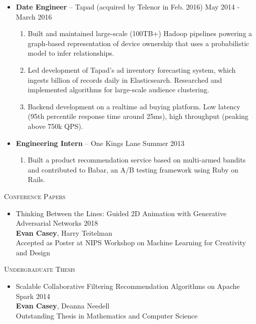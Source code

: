\documentclass[11pt]{article}
\renewcommand{\section}[1]
{\vspace{1.0\baselineskip}{\Large\textbf{#1}}}
\begin{document}
\begin{itemize}[leftmargin=12pt]
\begin{enumerate}[leftmargin=2em,labelindent=16pt,label=$\bullet$]
    \end{enumerate}
  \item[] \textbf{Date Engineer} -- Tapad (acquired by Telenor in Feb. 2016) \hfill May 2014 - March 2016 
    \begin{enumerate}[leftmargin=2em,labelindent=16pt,label=$\bullet$]
      \item Built and maintained large-scale (100TB+) Hadoop pipelines powering a graph-based representation of device ownership that uses a probabilistic model to infer relationships.
      \item Led development of Tapad's ad inventory forecasting system, which ingests billion of records daily in Elasticsearch. Researched and implemented algorithms for large-scale audience clustering.
      \item Backend development on a realtime ad buying platform. Low latency (95th percentile response time around 25ms), high throughput (peaking above 750k QPS).
    \end{enumerate}
  \item[] \textbf{Engineering Intern} -- One Kings Lane \hfill Summer 2013 
    \begin{enumerate}[leftmargin=2em,labelindent=16pt,label=$\bullet$]
      \item Built a product recommendation service based on multi-armed bandits and contributed to Babar, an A/B testing framework using Ruby on Rails.
    \end{enumerate}
\end{itemize}

\section{Publications}

\textsc{Conference Papers}
\begin{itemize}[leftmargin=12pt]
  \item[] Thinking Between the Lines: Guided 2D Animation with Generative Adversarial Networks \hfill 2018 \\
  \textbf{Evan Casey}, Harry Teitelman \\
  Accepted as Poster at NIPS Workshop on Machine Learning for Creativity and Design
\end{itemize}

\textsc{Undergraduate Thesis}
\begin{itemize}[leftmargin=12pt]
  \item[] Scalable Collaborative Filtering Recommendation Algorithms on Apache Spark \hfill 2014 \\
  \textbf{Evan Casey}, Deanna Needell \\
  Outstanding Thesis in Mathematics and Computer Science
    
\end{itemize}
\end{document}
